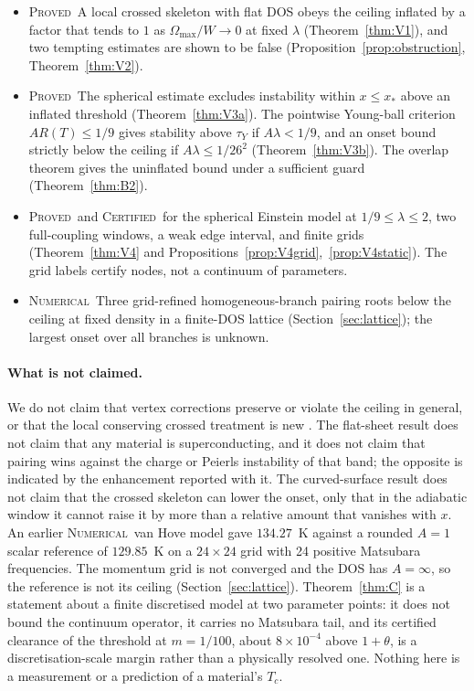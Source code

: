 \documentclass[11pt]{article}
\newcommand{\PROVED}{\upshape\mdseries\textsc{Proved}}
\newcommand{\CERT}{\upshape\mdseries\textsc{Certified}}
\newcommand{\NUM}{\upshape\mdseries\textsc{Numerical}}
\theoremstyle{definition}
\theoremstyle{remark}
\begin{document}
\begin{itemize}
\item \PROVED\ A local crossed skeleton with flat DOS obeys the ceiling inflated by a factor that tends to $1$ as $\Omega_{\max}/W\to0$ at fixed $\lambda$ (Theorem~\ref{thm:V1}), and two tempting estimates are shown to be false (Proposition~\ref{prop:obstruction}, Theorem~\ref{thm:V2}).
\item \PROVED\ The spherical estimate excludes instability within $x\le x_*$ above an inflated threshold (Theorem~\ref{thm:V3a}). The pointwise Young-ball criterion $AR(T)\le1/9$ gives stability above $\tau_Y$ if $A\lambda<1/9$, and an onset bound strictly below the ceiling if $A\lambda\le1/26^2$ (Theorem~\ref{thm:V3b}). The overlap theorem gives the uninflated bound under a sufficient guard (Theorem~\ref{thm:B2}).
\item \PROVED\ and \CERT\ for the spherical Einstein model at $1/9\le\lambda\le2$, two full-coupling windows, a weak edge interval, and finite grids (Theorem~\ref{thm:V4} and Propositions~\ref{prop:V4grid},~\ref{prop:V4static}). The grid labels certify nodes, not a continuum of parameters.
\item \NUM\ Three grid-refined homogeneous-branch pairing roots below the ceiling at fixed density in a finite-DOS lattice (Section~\ref{sec:lattice}); the largest onset over all branches is unknown.
\end{itemize}

\paragraph{What is not claimed.} We do not claim that vertex corrections preserve or violate the ceiling in general, or that the local conserving crossed treatment is new \cite{Miller}. The flat-sheet result does not claim that any material is superconducting, and it does not claim that pairing wins against the charge or Peierls instability of that band; the opposite is indicated by the enhancement reported with it. The curved-surface result does not claim that the crossed skeleton can lower the onset, only that in the adiabatic window it cannot raise it by more than a relative amount that vanishes with $x$. An earlier \NUM\ van Hove model gave $134.27$~K against a rounded $A=1$ scalar reference of $129.85$~K on a $24\times24$ grid with 24 positive Matsubara frequencies. The momentum grid is not converged and the DOS has $A=\infty$, so the reference is not its ceiling (Section~\ref{sec:lattice}). Theorem~\ref{thm:C} is a statement about a finite discretised model at two parameter points: it does not bound the continuum operator, it carries no Matsubara tail, and its certified clearance of the threshold at $m=1/100$, about $8\times10^{-4}$ above $1+\theta$, is a discretisation-scale margin rather than a physically resolved one. Nothing here is a measurement or a prediction of a material's $T_c$.
\end{document}
